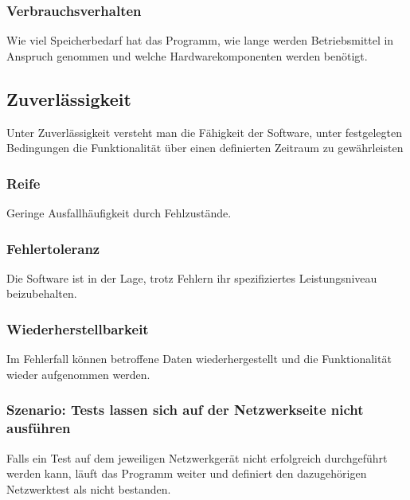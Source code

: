 \documentclass[
	ngerman,
	toc=listof, %
	toc=bibliography, %
	footnotes=multiple, %
	parskip=half, %
	numbers=noendperiod %
]{scrartcl}
\begin{document}
		\subsubsection{Verbrauchsverhalten}
		Wie viel Speicherbedarf hat das Programm, wie lange werden Betriebsmittel in Anspruch genommen und welche Hardwarekomponenten werden benötigt.

	\subsection{Zuverlässigkeit}
	Unter Zuverlässigkeit versteht man die Fähigkeit der Software, unter festgelegten Bedingungen die Funktionalität über einen definierten Zeitraum zu gewährleisten
	
		\subsubsection{Reife}
		Geringe Ausfallhäufigkeit durch Fehlzustände.

		\subsubsection{Fehlertoleranz}
		Die Software ist in der Lage, trotz Fehlern ihr spezifiziertes Leistungsniveau beizubehalten.

		\subsubsection{Wiederherstellbarkeit}
		Im Fehlerfall können betroffene Daten wiederhergestellt und die Funktionalität wieder aufgenommen werden.

		\subsubsection{Szenario: Tests lassen sich auf der Netzwerkseite nicht ausführen}
		Falls ein Test auf dem jeweiligen Netzwerkgerät nicht erfolgreich durchgeführt werden kann, läuft das Programm weiter und definiert den dazugehörigen Netzwerktest als nicht bestanden.
		
\end{document}
